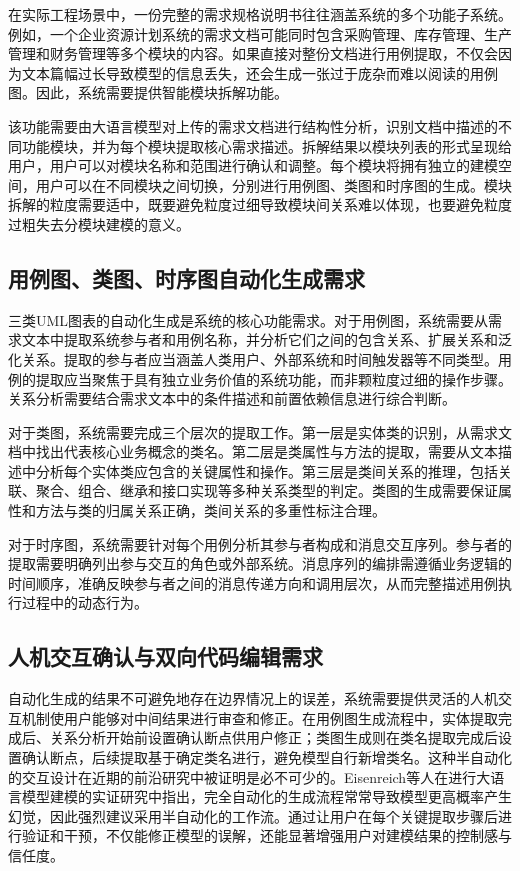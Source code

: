 在实际工程场景中，一份完整的需求规格说明书往往涵盖系统的多个功能子系统。例如，一个企业资源计划系统的需求文档可能同时包含采购管理、库存管理、生产管理和财务管理等多个模块的内容。如果直接对整份文档进行用例提取，不仅会因为文本篇幅过长导致模型的信息丢失，还会生成一张过于庞杂而难以阅读的用例图。因此，系统需要提供智能模块拆解功能。

该功能需要由大语言模型对上传的需求文档进行结构性分析，识别文档中描述的不同功能模块，并为每个模块提取核心需求描述。拆解结果以模块列表的形式呈现给用户，用户可以对模块名称和范围进行确认和调整。每个模块将拥有独立的建模空间，用户可以在不同模块之间切换，分别进行用例图、类图和时序图的生成。模块拆解的粒度需要适中，既要避免粒度过细导致模块间关系难以体现，也要避免粒度过粗失去分模块建模的意义。

\subsection{用例图、类图、时序图自动化生成需求}

三类UML图表的自动化生成是系统的核心功能需求。对于用例图，系统需要从需求文本中提取系统参与者和用例名称，并分析它们之间的包含关系、扩展关系和泛化关系。提取的参与者应当涵盖人类用户、外部系统和时间触发器等不同类型。用例的提取应当聚焦于具有独立业务价值的系统功能，而非颗粒度过细的操作步骤。关系分析需要结合需求文本中的条件描述和前置依赖信息进行综合判断。

对于类图，系统需要完成三个层次的提取工作。第一层是实体类的识别，从需求文档中找出代表核心业务概念的类名。第二层是类属性与方法的提取，需要从文本描述中分析每个实体类应包含的关键属性和操作。第三层是类间关系的推理，包括关联、聚合、组合、继承和接口实现等多种关系类型的判定。类图的生成需要保证属性和方法与类的归属关系正确，类间关系的多重性标注合理。

对于时序图，系统需要针对每个用例分析其参与者构成和消息交互序列。参与者的提取需要明确列出参与交互的角色或外部系统。消息序列的编排需遵循业务逻辑的时间顺序，准确反映参与者之间的消息传递方向和调用层次，从而完整描述用例执行过程中的动态行为。

\subsection{人机交互确认与双向代码编辑需求}

自动化生成的结果不可避免地存在边界情况上的误差，系统需要提供灵活的人机交互机制使用户能够对中间结果进行审查和修正。在用例图生成流程中，实体提取完成后、关系分析开始前设置确认断点供用户修正；类图生成则在类名提取完成后设置确认断点，后续提取基于确定类名进行，避免模型自行新增类名。这种半自动化的交互设计在近期的前沿研究中被证明是必不可少的。Eisenreich等人\cite{eisenreich2025leveraging}在进行大语言模型建模的实证研究中指出，完全自动化的生成流程常常导致模型更高概率产生幻觉，因此强烈建议采用半自动化的工作流。通过让用户在每个关键提取步骤后进行验证和干预，不仅能修正模型的误解，还能显著增强用户对建模结果的控制感与信任度。

